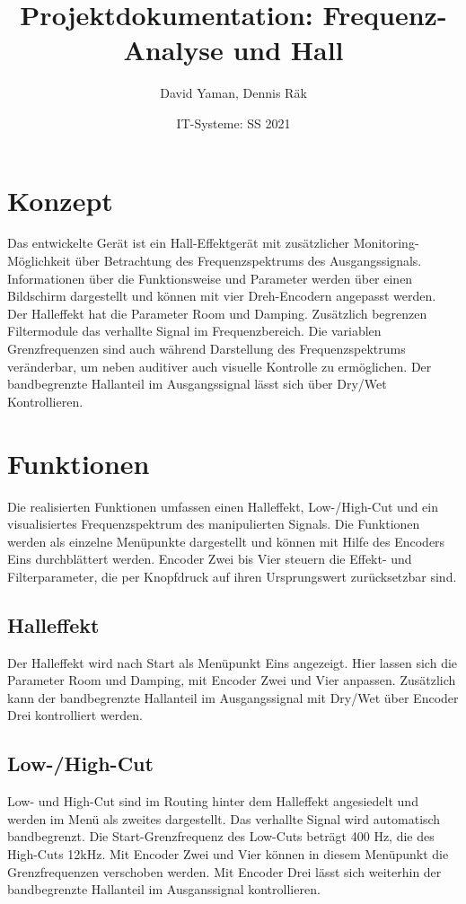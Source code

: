 \documentclass[12pt]{article}
\title{Projektdokumentation: Frequenz-Analyse und Hall}        %
\author{David Yaman, Dennis Räk}            %
\date{IT-Systeme: SS 2021}                    %
\begin{document}
\maketitle
\newpage
\tableofcontents
\newpage
\section{Konzept}
Das entwickelte Gerät ist ein Hall-Effektgerät mit zusätzlicher Monitoring-Möglichkeit über Betrachtung des Frequenzspektrums des Ausgangssignals. 
Informationen über die Funktionsweise und Parameter werden über einen Bildschirm dargestellt und können mit vier Dreh-Encodern angepasst werden. 
Der Halleffekt hat die Parameter Room und Damping. Zusätzlich begrenzen Filtermodule das verhallte Signal im Frequenzbereich. 
Die variablen Grenzfrequenzen sind auch während Darstellung des Frequenzspektrums veränderbar, um neben auditiver auch visuelle Kontrolle zu ermöglichen. 
Der bandbegrenzte Hallanteil im Ausgangssignal lässt sich über Dry/Wet Kontrollieren.
\section{Funktionen}
Die realisierten Funktionen umfassen einen Halleffekt, Low-/High-Cut und ein visualisiertes Frequenzspektrum des manipulierten Signals. 
Die Funktionen werden als einzelne Menüpunkte dargestellt und können mit Hilfe des Encoders Eins durchblättert werden. 
Encoder Zwei bis Vier steuern die Effekt- und Filterparameter, die per Knopfdruck auf ihren Ursprungswert zurücksetzbar sind.
\subsection{Halleffekt}
Der Halleffekt wird nach Start als Menüpunkt Eins angezeigt. 
Hier lassen sich die Parameter Room und Damping, mit Encoder Zwei und Vier anpassen. 
Zusätzlich kann der bandbegrenzte Hallanteil im Ausgangssignal mit Dry/Wet über Encoder Drei kontrolliert werden.

\subsection{Low-/High-Cut}
Low- und High-Cut sind im Routing hinter dem Halleffekt angesiedelt und werden im Menü als zweites dargestellt. 
Das verhallte Signal wird automatisch bandbegrenzt. 
Die Start-Grenzfrequenz des Low-Cuts beträgt 400 Hz, die des High-Cuts 12kHz. 
Mit Encoder Zwei und Vier können in diesem Menüpunkt die Grenzfrequenzen verschoben werden. 
Mit Encoder Drei lässt sich weiterhin der bandbegrenzte Hallanteil im Ausganssignal kontrollieren. 
\end{document}
